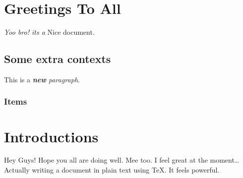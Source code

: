 \documentclass[a4paper,12pt]{article}
\begin{document}
\section{Greetings To All}
\emph{Yoo bro! \emph{its a}} Nice document.

\subsection{Some extra contexts}
This is a \textit{\textbf{new} paragraph}.

\subsubsection{Items}

\section{Introductions}
Hey Guys! Hope you all are doing well. Mee too. I feel great at the moment\dots
Actually writing a document in plain text using TeX. It feels powerful.
\end{document}
